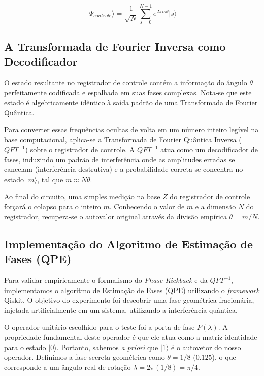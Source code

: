 \documentclass[12pt, a4paper]{article}
\newcommand{\ket}[1]{\lvert #1 \rangle}
\begin{document}
\begin{equation}
\ket{\Psi_{controle}} = \frac{1}{\sqrt{N}} \sum_{s=0}^{N-1} e^{2\pi i s \theta} \ket{s}
\end{equation}


\subsection{A Transformada de Fourier Inversa como Decodificador}

O estado resultante no registrador de controle contém a informação do ângulo $\theta$ perfeitamente codificada e espalhada em suas fases complexas. Nota-se que este estado é algebricamente idêntico à saída padrão de uma Transformada de Fourier Quântica.

Para converter essas frequências ocultas de volta em um número inteiro legível na base computacional, aplica-se a Transformada de Fourier Quântica Inversa ($QFT^{-1}$) sobre o registrador de controle. A $QFT^{-1}$ atua como um decodificador de fases, induzindo um padrão de interferência onde as amplitudes erradas se cancelam (interferência destrutiva) e a probabilidade correta se concentra no estado $\ket{m}$, tal que $m \approx N\theta$.

Ao final do circuito, uma simples medição na base $Z$ do registrador de controle forçará o colapso para o inteiro $m$. Conhecendo o valor de $m$ e a dimensão $N$ do registrador, recupera-se o autovalor original através da divisão empírica $\theta = m/N$.

\subsection{Implementação do Algoritmo de Estimação de Fases (QPE)}

Para validar empiricamente o formalismo do \textit{Phase Kickback} e da $QFT^{-1}$, implementamos o algoritmo de Estimação de Fases (QPE) utilizando o \textit{framework} Qiskit. O objetivo do experimento foi descobrir uma fase geométrica fracionária, injetada artificialmente em um sistema, utilizando a interferência quântica.

O operador unitário escolhido para o teste foi a porta de fase $P(\lambda)$. A propriedade fundamental deste operador é que ele atua como a matriz identidade para o estado $\ket{0}$. Portanto, sabemos \textit{a priori} que $\ket{1}$ é o autovetor do nosso operador. Definimos a fase secreta geométrica como $\theta = 1/8$ ($0.125$), o que corresponde a um ângulo real de rotação $\lambda = 2\pi(1/8) = \pi/4$.
\end{document}
